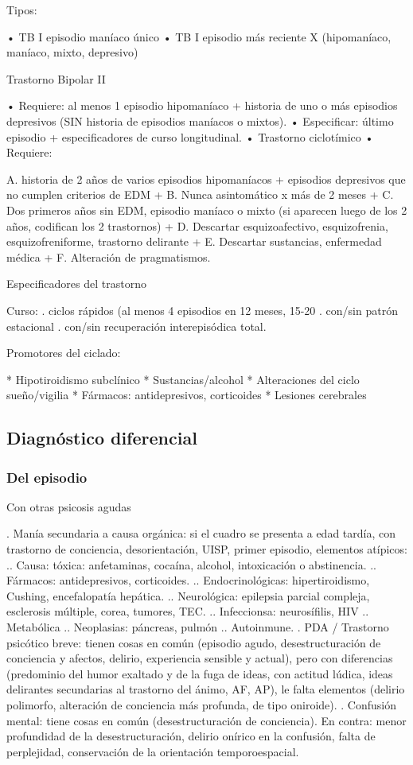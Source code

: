 \documentclass{scrbook}
\begin{document}
Tipos:

• TB I episodio maníaco único
• TB I episodio más reciente X (hipomaníaco, maníaco, mixto, depresivo)

Trastorno Bipolar II

• Requiere: al menos 1 episodio hipomaníaco + historia de uno o más episodios depresivos (SIN historia de episodios maníacos o mixtos).
• Especificar: último episodio + especificadores de curso longitudinal.
• Trastorno ciclotímico
• Requiere:

A. historia de 2 años de varios episodios hipomaníacos + episodios depresivos que no cumplen criterios de EDM +
B. Nunca asintomático x más de 2 meses +
C. Dos primeros años sin EDM, episodio maníaco o mixto (si aparecen luego de los 2 años, codifican los 2 trastornos) +
D. Descartar esquizoafectivo, esquizofrenia, esquizofreniforme, trastorno delirante +
E. Descartar sustancias, enfermedad médica +
F. Alteración de pragmatismos.

Especificadores del trastorno

Curso:
. ciclos rápidos (al menos 4 episodios en 12 meses, 15-20%
. con/sin patrón estacional
. con/sin recuperación interepisódica total.

Promotores del ciclado:

* Hipotiroidismo subclínico
* Sustancias/alcohol
* Alteraciones del ciclo sueño/vigilia
* Fármacos: antidepresivos, corticoides
* Lesiones cerebrales

\subsection*{Diagnóstico diferencial}
\subsubsection*{Del episodio}
Con otras psicosis agudas

. Manía secundaria a causa orgánica: si el cuadro se presenta a edad tardía, con trastorno de conciencia, desorientación, UISP, primer episodio, elementos atípicos:
.. Causa: tóxica: anfetaminas, cocaína, alcohol, intoxicación o abstinencia.
.. Fármacos: antidepresivos, corticoides.
.. Endocrinológicas: hipertiroidismo, Cushing, encefalopatía hepática.
.. Neurológica: epilepsia parcial compleja, esclerosis múltiple, corea, tumores, TEC.
.. Infeccionsa: neurosífilis, HIV
.. Metabólica
.. Neoplasias: páncreas, pulmón
.. Autoinmune.
. PDA / Trastorno psicótico breve: tienen cosas en común (episodio agudo, desestructuración de conciencia y afectos, delirio, experiencia sensible y actual), pero con diferencias (predominio del humor exaltado y de la fuga de ideas, con actitud lúdica, ideas delirantes secundarias al trastorno del ánimo, AF, AP), le falta elementos (delirio polimorfo, alteración de conciencia más profunda, de tipo oniroide).
. Confusión mental: tiene cosas en común (desestructuración de conciencia). En contra: menor profundidad de la desestructuración, delirio onírico en la confusión, falta de perplejidad, conservación de la orientación temporoespacial.
\end{document}
